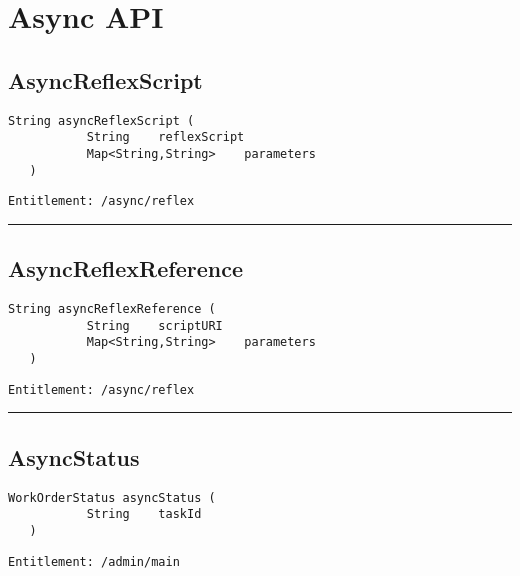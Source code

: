 \chapter{Async API}

\section{AsyncReflexScript}
\label{Api:AsyncReflexScript}
\begin{lstlisting}[style=nonumbers]
   String asyncReflexScript (
           String    reflexScript
           Map<String,String>    parameters
   )
\end{lstlisting}
\begin{Verbatim}[formatcom=\color{Maroon}]
  Entitlement: /async/reflex
\end{Verbatim}



\rule{12cm}{2pt}
\section{AsyncReflexReference}
\label{Api:AsyncReflexReference}
\begin{lstlisting}[style=nonumbers]
   String asyncReflexReference (
           String    scriptURI
           Map<String,String>    parameters
   )
\end{lstlisting}
\begin{Verbatim}[formatcom=\color{Maroon}]
  Entitlement: /async/reflex
\end{Verbatim}



\rule{12cm}{2pt}
\section{AsyncStatus}
\label{Api:AsyncStatus}
\begin{lstlisting}[style=nonumbers]
   WorkOrderStatus asyncStatus (
           String    taskId
   )
\end{lstlisting}
\begin{Verbatim}[formatcom=\color{Maroon}]
  Entitlement: /admin/main
\end{Verbatim}



